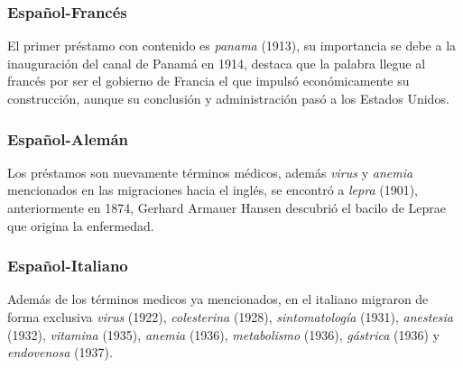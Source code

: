 \subsubsection*{Español-Francés}%

El primer préstamo con contenido es \textit{panama} (1913), su importancia se debe a la inauguración del canal de Panamá en 1914, destaca que la palabra llegue al francés por ser el gobierno de Francia el que impulsó económicamente su construcción, aunque su conclusión y administración pasó a los Estados Unidos.  




\subsubsection*{Español-Alemán}


Los préstamos son nuevamente términos médicos, además \textit{virus} y \textit{anemia} mencionados en las migraciones hacia el inglés, se encontró a \textit{lepra} (1901), anteriormente en 1874, Gerhard Armauer Hansen descubrió el bacilo de Leprae que origina la enfermedad.



\subsubsection*{Español-Italiano}%


Además de los términos medicos ya mencionados, en el italiano migraron de forma  exclusiva  \textit{virus} (1922), \textit{colesterina} (1928),  \textit{sintomatología} (1931), \textit{anestesia} (1932), \textit{vitamina} (1935), \textit{anemia} (1936), \textit{metabolismo} (1936),  \textit{gástrica} (1936)  y \textit{endovenosa} (1937).  







